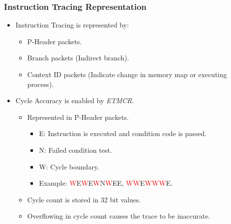 \documentclass{beamer}
\begin{document}
\begin{frame}
    \frametitle{Instruction Tracing Representation}
    \begin{itemize}
        \item Instruction Tracing is represented by:
            \begin{itemize}
                \item P-Header packets.
                \item Branch packets (Indirect branch).
                \item Context ID packets (Indicate change in memory map or
                    executing process).
            \end{itemize}
        \item Cycle Accuracy is enabled by \textit{ETMCR}.
            \begin{itemize}
                \item Represented in P-Header packets.
                    \begin{itemize}
                        \item E: Instruction is executed and condition code is
                            passed.
                        \item N: Failed condition test.
                        \item W: Cycle boundary.
                        \item Example: \textcolor{red}{W}E\textcolor{red}{W}E\textcolor{red}{W}N\textcolor{red}{W}EE, \textcolor{red}{WW}E\textcolor{red}{WWW}E.
                    \end{itemize}
                \item Cycle count is stored in 32 bit values.
                \item Overflowing in cycle count causes the trace to be
                    inaccurate.
            \end{itemize}
    \end{itemize}
\end{frame}
\end{document}
